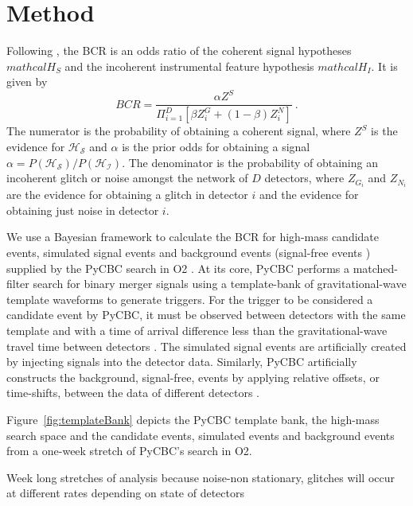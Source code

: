 \documentclass[%
 reprint,
 amsmath,amssymb,
 aps,
]{revtex4}
\newcommand{\pycbc}{{\sc PyCBC}\xspace}
\newcommand{\bcr}{{\sc BCR}\xspace}
\begin{document}
\section{Method}

Following \citet{bcr_paper}, the \bcr is an odds ratio of the coherent signal hypotheses $mathcal{H_S}$ and the incoherent instrumental feature hypothesis $mathcal{H_I}$. It is given by
\begin{equation}
BCR = \frac{\alpha Z^S}{\Pi^D_{i=1}[\beta Z^G_i + (1-\beta)Z^N_i]}\ .
\end{equation}
The numerator is the probability of obtaining a coherent signal, where $Z^S$ is the evidence for $\mathcal{H_S}$ and $\alpha$ is the prior odds for obtaining a signal $\alpha=P(\mathcal{H_S})/P(\mathcal{H_I})$. The denominator is the probability of obtaining an incoherent glitch or noise amongst the network of $D$ detectors, where $Z_G_i$ and $Z_N_i$ are the evidence for obtaining a glitch in detector $i$ and the evidence for obtaining just noise in detector $i$.

 
We use a Bayesian framework to calculate the \bcr for high-mass candidate events, simulated signal events and  background events (signal-free events ) supplied by the \pycbc \cite{pycbc_code} search in O2  \cite{pycbc_og0, pycbc_og1, pycbc_og2, pycbc_og3, pycbc_og4, pycbc_og5}.  At its core, \pycbc performs a matched-filter search for binary merger signals using a template-bank of gravitational-wave template waveforms to generate triggers. For the trigger to be considered a  candidate event by \pycbc, it must be observed between detectors with the same template and with a time of arrival difference less than the gravitational-wave travel time between detectors \cite{pycbc_og0}. The simulated signal events are artificially created by injecting signals into the detector data. Similarly, \pycbc artificially constructs the background, signal-free, events by applying relative offsets, or time-shifts, between the data of different detectors \cite{pycbc_og0}. 


Figure~\ref{fig:templateBank} depicts the \pycbc template bank, the high-mass search space and the candidate events, simulated events and background events from a one-week stretch of \pycbc's search in O2. 

Week long stretches of analysis because noise-non stationary, glitches will occur at different rates depending on state of detectors 
\end{document}
